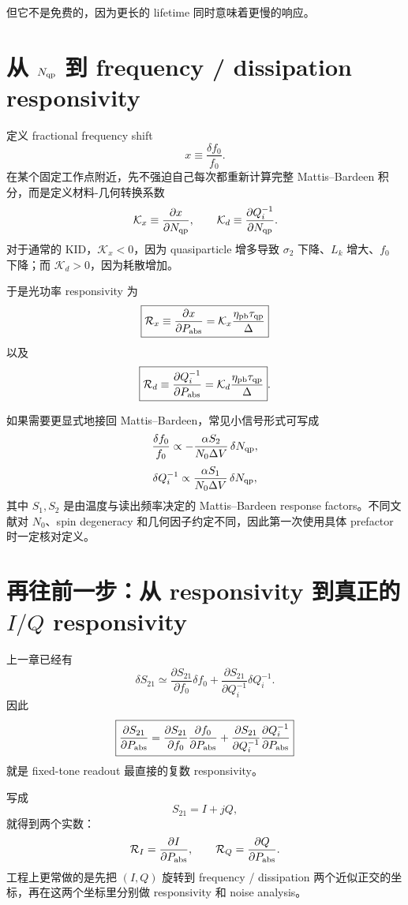 \documentclass[11pt,a4paper,openany]{ctexrep}
\begin{document}
但它不是免费的，因为更长的 lifetime 同时意味着更慢的响应。

\section{从 $N_{\rm qp}$ 到 frequency / dissipation responsivity}

定义 fractional frequency shift
\[
x\equiv \frac{\delta f_0}{f_0}.
\]
在某个固定工作点附近，先不强迫自己每次都重新计算完整 Mattis--Bardeen 积分，而是定义材料-几何转换系数
\[
\mathcal K_x\equiv \frac{\partial x}{\partial N_{\rm qp}},
\qquad
\mathcal K_d\equiv
\frac{\partial Q_i^{-1}}{\partial N_{\rm qp}}.
\]
对于通常的 KID，$\mathcal K_x<0$，因为 quasiparticle 增多导致 $\sigma_2$ 下降、$L_k$ 增大、$f_0$ 下降；而 $\mathcal K_d>0$，因为耗散增加。

于是光功率 responsivity 为
\[
\boxed{
\mathcal R_x
\equiv
\frac{\partial x}{\partial P_{\rm abs}}
=\mathcal K_x
\frac{\eta_{\rm pb}\tau_{\rm qp}}{\Delta}
}
\]
以及
\[
\boxed{
\mathcal R_d
\equiv
\frac{\partial Q_i^{-1}}{\partial P_{\rm abs}}
=\mathcal K_d
\frac{\eta_{\rm pb}\tau_{\rm qp}}{\Delta}
}.
\]

如果需要更显式地接回 Mattis--Bardeen，常见小信号形式可写成
\[
\frac{\delta f_0}{f_0}
\propto
-\frac{\alpha S_2}{N_0\Delta V}\,\delta N_{\rm qp},
\]
\[
\delta Q_i^{-1}
\propto
\frac{\alpha S_1}{N_0\Delta V}\,\delta N_{\rm qp},
\]
其中 $S_1,S_2$ 是由温度与读出频率决定的 Mattis--Bardeen response factors。不同文献对 $N_0$、spin degeneracy 和几何因子约定不同，因此第一次使用具体 prefactor 时一定核对定义。

\section{再往前一步：从 responsivity 到真正的 $I/Q$ responsivity}

上一章已经有
\[
\delta S_{21}
\simeq
\frac{\partial S_{21}}{\partial f_0}\delta f_0
+
\frac{\partial S_{21}}{\partial Q_i^{-1}}\delta Q_i^{-1}.
\]
因此
\[
\boxed{
\frac{\partial S_{21}}{\partial P_{\rm abs}}
=
\frac{\partial S_{21}}{\partial f_0}
\frac{\partial f_0}{\partial P_{\rm abs}}
+
\frac{\partial S_{21}}{\partial Q_i^{-1}}
\frac{\partial Q_i^{-1}}{\partial P_{\rm abs}}
}
\]
就是 fixed-tone readout 最直接的复数 responsivity。

写成
\[
S_{21}=I+jQ,
\]
就得到两个实数：
\[
\mathcal R_I=\frac{\partial I}{\partial P_{\rm abs}},
\qquad
\mathcal R_Q=\frac{\partial Q}{\partial P_{\rm abs}}.
\]
工程上更常做的是先把 $(I,Q)$ 旋转到 frequency / dissipation 两个近似正交的坐标，再在这两个坐标里分别做 responsivity 和 noise analysis。
\end{document}
